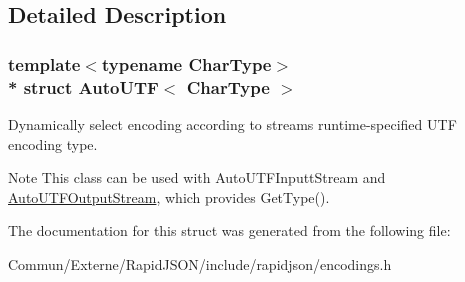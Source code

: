 \subsection{Detailed Description}
\subsubsection*{template$<$typename Char\+Type$>$\\*
struct Auto\+U\+T\+F$<$ Char\+Type $>$}

Dynamically select encoding according to stream\textquotesingle{}s runtime-\/specified U\+TF encoding type. 

\begin{DoxyNote}{Note}
This class can be used with Auto\+U\+T\+F\+Inputt\+Stream and \hyperlink{class_auto_u_t_f_output_stream}{Auto\+U\+T\+F\+Output\+Stream}, which provides Get\+Type(). 
\end{DoxyNote}


The documentation for this struct was generated from the following file\+:\begin{DoxyCompactItemize}
\item 
Commun/\+Externe/\+Rapid\+J\+S\+O\+N/include/rapidjson/encodings.\+h\end{DoxyCompactItemize}

